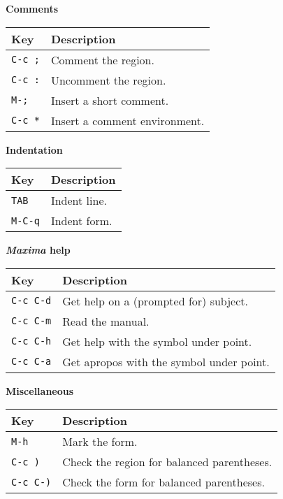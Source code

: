 \documentclass{article}
\newcommand{\mx}{\textsl{\sffamily Maxima}}
\begin{document}
\newpage

\noindent
\textbf{Comments}

\smallskip

\noindent
\begin{tabular}{p{\firstcol}p{\secondcol}}
\hline
\textbf{Key} & \textbf{Description}\\
\hline
\texttt{C-c ;} & Comment the region.\\
\texttt{C-c :} & Uncomment the region.\\
\texttt{M-;} & Insert a short comment.\\
\texttt{C-c *} & Insert a comment environment.
\end{tabular}


\smallskip

\noindent
\textbf{Indentation}

\smallskip

\noindent
\begin{tabular}{p{\firstcol}p{\secondcol}}
\hline
\textbf{Key} & \textbf{Description}\\
\hline
\texttt{TAB} & Indent line.\\
\texttt{M-C-q} & Indent form.
\end{tabular}


\smallskip

\noindent
\textbf{\mx{} help}

\smallskip

\noindent
\begin{tabular}{p{\firstcol}p{\secondcol}}
\hline
\textbf{Key} & \textbf{Description}\\
\hline
\texttt{C-c C-d}
& Get help on a (prompted for) subject.\\
\texttt{C-c C-m}
& Read the manual.\\
\texttt{C-c C-h} & Get help with the symbol under point.\\
\texttt{C-c C-a} & Get apropos with the symbol under point.
\end{tabular}

\smallskip

\noindent
\textbf{Miscellaneous}

\smallskip

\noindent
\begin{tabular}{p{\firstcol}p{\secondcol}}
\hline
\textbf{Key} & \textbf{Description}\\
\hline
\texttt{M-h} & Mark the form.\\
\texttt{C-c )} & Check the region for balanced parentheses.\\
\texttt{C-c C-)} & Check the form for balanced parentheses.
\end{tabular}
\end{document}
